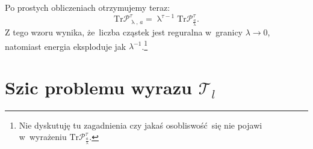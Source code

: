 \documentclass[a4paper,11pt]{article}
\newcommand{\T}{\mathcal{T}_{ l }}
\begin{document}
Po prostych obliczeniach otrzymujemy teraz:
\begin{equation}
\mathrm{Tr}\mathcal{P}^{ \tau }_{ \uplambda, \, a } = \uplambda^{ \tau - 1 } \mathrm{Tr}\mathcal{P}^{ \tau }_{ \frac{ a }{ \uplambda } }. \label{eq:15}
\end{equation}
Z tego wzoru wynika, że~liczba cząstek jest reguralna w~granicy $\lambda \rightarrow 0$, natomiast energia eksploduje jak $\lambda^{ -1 }$.\footnote{Nie dyskutuję tu zagadnienia czy jakaś osobliswość~się nie pojawi w~wyrażeniu $\mathrm{Tr}\mathcal{P}^{ \tau }_{ \frac{ a }{ \uplambda } }$.}

\section*{Szic problemu wyrazu $\T$}
\end{document}
